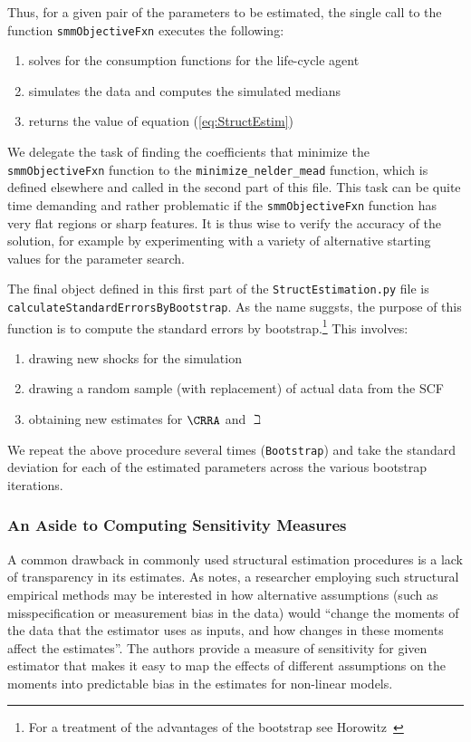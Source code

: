 \documentclass[titlepage, headings=optiontotocandhead]{\econtex}
\begin{document}
Thus, for a given pair of the parameters to be estimated, the single 
call to the function \texttt{smmObjectiveFxn} executes the following:
\begin{enumerate}
\item solves for the consumption functions for the life-cycle agent
\item simulates the data and computes the simulated medians
\item returns the value of equation (\ref{eq:StructEstim})
\end{enumerate}

We delegate the task of finding the coefficients that minimize the
\texttt{smmObjectiveFxn} function to the \texttt{minimize\_nelder\_mead}
function, which is defined elsewhere and called in the second part of this file.
This task can be quite time demanding and rather problematic if the
\texttt{smmObjectiveFxn} function has very flat regions
or sharp features. It is thus wise to verify the accuracy of the
solution, for example by experimenting with a variety of alternative starting values for the
parameter search.

The final object defined in this first part of the \texttt{StructEstimation.py}
file is \texttt{calculateStandardErrorsByBootstrap}. As the name suggsts, the
purpose of this function is to compute the standard errors by bootstrap.\footnote{For a
  treatment of the advantages of the bootstrap see
  Horowitz~\citeyearpar{horowitzBootstrap}} This involves:
\begin{enumerate}
\item drawing new shocks for the simulation
\item drawing a random sample (with replacement) of actual data from the SCF
\item obtaining new estimates for $\CRRA$ and ${\beth}$
\end{enumerate}
We repeat the above procedure several times (\texttt{Bootstrap}) and
take the standard deviation for each of the estimated parameters across the various bootstrap iterations.

\subsubsection{An Aside to Computing Sensitivity Measures}\label{subsubsec:sensmeas}

A common drawback in commonly used structural estimation procedures is a lack of transparency in its estimates.
As \cite{andrews2017measuring} notes, a researcher employing such structural empirical methods may be interested
in how alternative assumptions (such as misspecification or measurement bias in the data) would ``change the moments
of the data that the estimator uses as inputs, and how changes in these moments affect the estimates''. The authors
provide a measure of sensitivity for given estimator that makes it easy to map the effects of different assumptions
on the moments into predictable bias in the estimates for non-linear models. 
\end{document}

